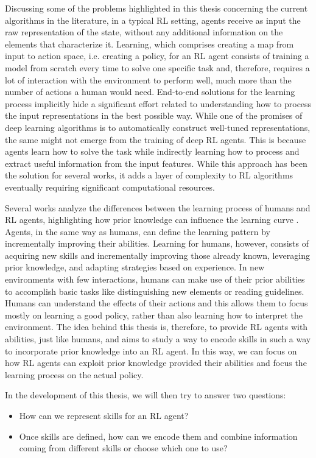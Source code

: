 Discussing some of the problems highlighted in this thesis concerning the current algorithms in the literature, in a typical RL setting, agents receive as input the raw representation of the state, without any additional information on the elements that characterize it.
Learning, which comprises creating a map from input to action space, i.e. creating a policy,  for an RL agent consists of training a model from scratch every time to solve one specific task and, therefore, requires a lot of interaction with the environment to perform well, much more than the number of actions a human would need.
End-to-end solutions for the learning process implicitly hide a significant effort related to understanding how to process the input representations in the best possible way.
While one of the promises of deep learning algorithms is to automatically construct well-tuned representations, the same might not emerge from the training of deep RL agents. 
This is because agents learn how to solve the task while indirectly learning how to process and extract useful information from the input features. 
While this approach has been the solution for several works, it adds a layer of complexity to RL algorithms eventually requiring significant computational resources.

Several works analyze the differences between the learning process of humans and RL agents, highlighting how prior knowledge can influence the learning curve \citep{lake2017building, dubey2018investigating}.
Agents, in the same way as humans, can define the learning pattern by incrementally improving their abilities.
Learning for humans, however, consists of acquiring new skills and incrementally improving those already known, leveraging prior knowledge, and adapting strategies based on experience.
In new environments with few interactions, humans can make use of their prior abilities to accomplish basic tasks like distinguishing new elements or reading guidelines.
Humans can understand the effects of their actions and this allows them to focus mostly on learning a good policy, rather than also learning how to interpret the environment. 
The idea behind this thesis is, therefore, to provide RL agents with abilities, just like humans, and aims to study a way to encode skills in such a way to incorporate prior knowledge into an RL agent.
In this way, we can focus on how RL agents can exploit prior knowledge provided their abilities and focus the learning process on the actual policy.

In the development of this thesis, we will then try to answer two questions:
\begin{itemize}
    \item How can we represent skills for an RL agent?
    \item Once skills are defined, how can we encode them and combine information coming from different skills or choose which one to use?
\end{itemize}


